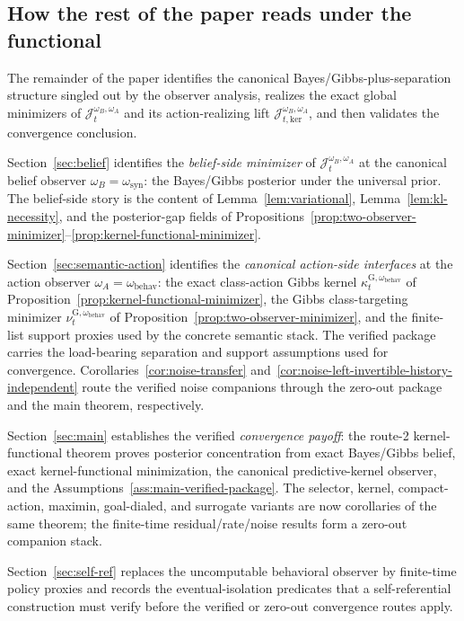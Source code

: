 \documentclass[11pt]{article}
\theoremstyle{definition}
\theoremstyle{remark}
\theoremstyle{plain}
\theoremstyle{definition}
\begin{document}
\subsection{How the rest of the paper reads under the functional}
\label{sec:functional-forward-plan}

The remainder of the paper identifies the canonical Bayes/Gibbs-plus-separation structure singled out by the observer analysis, realizes the exact global minimizers of $\mathcal J_t^{\omega_B,\omega_A}$ and its action-realizing lift $\mathcal J_{t,\mathrm{ker}}^{\omega_B,\omega_A}$, and then validates the convergence conclusion.

Section~\ref{sec:belief} identifies the \emph{belief-side minimizer} of $\mathcal J_t^{\omega_B,\omega_A}$ at the canonical belief observer $\omega_B=\omega_{\mathrm{syn}}$: the Bayes/Gibbs posterior under the universal prior. The belief-side story is the content of Lemma~\ref{lem:variational}, Lemma~\ref{lem:kl-necessity}, and the posterior-gap fields of Propositions~\ref{prop:two-observer-minimizer}--\ref{prop:kernel-functional-minimizer}.

Section~\ref{sec:semantic-action} identifies the \emph{canonical action-side interfaces} at the action observer $\omega_A=\omega_{\mathrm{behav}}$: the exact class-action Gibbs kernel $\kappa_t^{\mathrm G,\omega_{\mathrm{behav}}}$ of Proposition~\ref{prop:kernel-functional-minimizer}, the Gibbs class-targeting minimizer $\nu_t^{\mathrm G,\omega_{\mathrm{behav}}}$ of Proposition~\ref{prop:two-observer-minimizer}, and the finite-list support proxies used by the concrete semantic stack. The verified package carries the load-bearing separation and support assumptions used for convergence. Corollaries~\ref{cor:noise-transfer} and~\ref{cor:noise-left-invertible-history-independent} route the verified noise companions through the zero-out package and the main theorem, respectively.

Section~\ref{sec:main} establishes the verified \emph{convergence payoff}: the route-2 kernel-functional theorem proves posterior concentration from exact Bayes/Gibbs belief, exact kernel-functional minimization, the canonical predictive-kernel observer, and the Assumptions~\ref{ass:main-verified-package}. The selector, kernel, compact-action, maximin, goal-dialed, and surrogate variants are now corollaries of the same theorem; the finite-time residual/rate/noise results form a zero-out companion stack.

Section~\ref{sec:self-ref} replaces the uncomputable behavioral observer by finite-time policy proxies and records the eventual-isolation predicates that a self-referential construction must verify before the verified or zero-out convergence routes apply.
\end{document}
